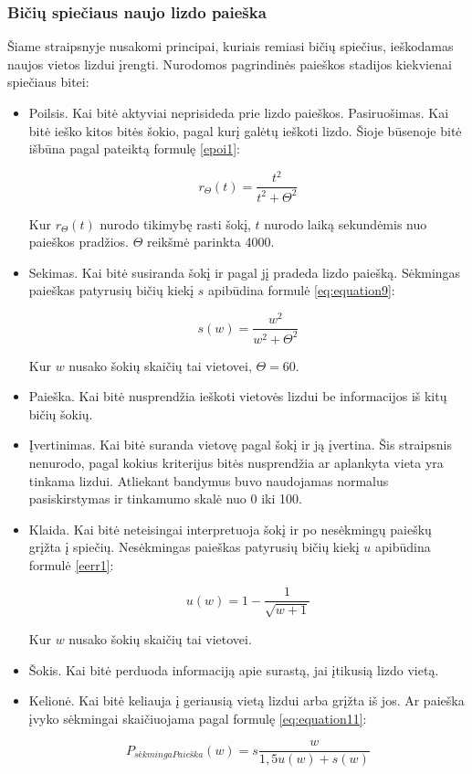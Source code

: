 \documentclass{VUMIFPSmagistrinis}
\begin{document}
\subsubsection{Bičių spiečiaus naujo lizdo paieška}

Šiame straipsnyje \cite{JMB06} nusakomi principai, kuriais remiasi bičių spiečius, ieškodamas naujos vietos lizdui įrengti. Nurodomos pagrindinės paieškos stadijos kiekvienai spiečiaus bitei:
\begin{itemize}
    \item 
	Poilsis. Kai bitė aktyviai neprisideda prie lizdo paieškos.
	Pasiruošimas. Kai bitė ieško kitos bitės šokio, pagal kurį galėtų ieškoti lizdo. Šioje būsenoje bitė išbūna pagal pateiktą formulę \eqref{epoi1}:

\begin{equation}\label{epoi1}
    r_{\Theta}(t)= \frac{t^2}{t^2+\Theta^2}
\end{equation}

Kur $r_{\Theta}(t)$ nurodo tikimybę rasti šokį, $t$ nurodo laiką sekundėmis nuo paieškos pradžios. $\Theta$ reikšmė parinkta 4000.
\item 
	Sekimas. Kai bitė susiranda šokį ir pagal jį pradeda lizdo paiešką.  Sėkmingas paieškas patyrusių bičių kiekį $s$ apibūdina formulė \eqref{eq:equation9}:
	
\begin{equation}
    \label{eq:equation9}
    s(w)=\frac{w^2}{w^2+\Theta ^2}    
\end{equation}

Kur $w$ nusako šokių skaičių tai vietovei, $\Theta=60$.
\item 
	Paieška. Kai bitė nusprendžia ieškoti vietovės lizdui be informacijos iš kitų bičių šokių.
\item 	
Įvertinimas. Kai bitė suranda vietovę pagal šokį ir ją įvertina. Šis straipsnis nenurodo, pagal kokius kriterijus bitės nusprendžia ar aplankyta vieta yra tinkama lizdui. Atliekant bandymus buvo naudojamas normalus pasiskirstymas ir tinkamumo skalė nuo 0 iki 100.
\item 
	Klaida. Kai bitė neteisingai interpretuoja šokį ir po nesėkmingų paieškų grįžta į spiečių. Nesėkmingas paieškas patyrusių bičių kiekį $u$ apibūdina formulė \eqref{eerr1}:

\begin{equation}
\label{eerr1}
    u(w)=1-\frac{1}{\sqrt{w+1}}
\end{equation}

Kur $w$ nusako šokių skaičių tai vietovei.
	
\item 	
	Šokis. Kai bitė perduoda informaciją apie surastą, jai įtikusią lizdo vietą.
\item 		
Kelionė. Kai bitė keliauja į geriausią vietą lizdui arba grįžta iš jos. Ar paieška įvyko sėkmingai skaičiuojama pagal formulę \eqref{eq:equation11}:

\begin{equation}
    \label{eq:equation11}
    P_{s\textit{\.e}kmingaPaie\textit{\v{s}}ka}(w) = s\frac{w}{1,5 u(w)+s(w)}    
\end{equation}

\end{itemize}
\end{document}
